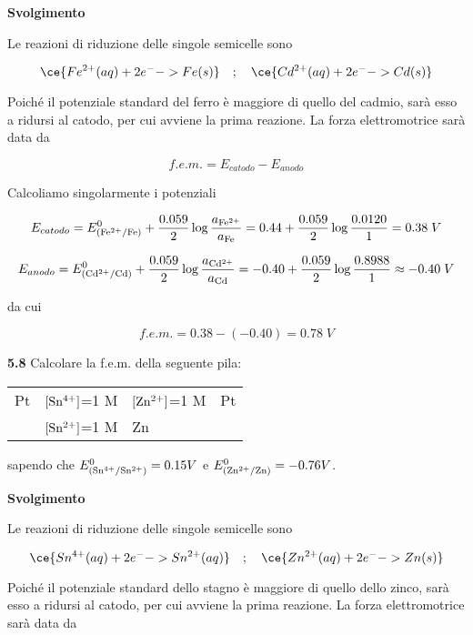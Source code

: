 \vspace{0.2cm}\large\textbf{Svolgimento}\normalsize

\vspace{0.2cm}Le reazioni di riduzione delle singole semicelle sono

$$\ce{Fe^{2+}(aq) + 2 e^- -> Fe(s)}
\quad;\quad
\ce{Cd^{2+}(aq) + 2 e^- -> Cd(s)}$$

Poiché il potenziale standard del ferro è maggiore di quello del cadmio, sarà esso a ridursi al catodo, per cui avviene la prima reazione. La forza elettromotrice sarà data da

$$f.e.m. = E_{catodo} - E_{anodo}$$

Calcoliamo singolarmente i potenziali

$$E_{catodo}
=E^0_{(\rm Fe^{2+}/Fe)} + \frac{0.059}{2} \log \frac{a_{\rm Fe^{2+}}}{a_{\rm Fe}}
=0.44 + \frac{0.059}{2} \log \frac{0.0120}{1}
=0.38\;V$$

$$E_{anodo} = E^0_{(\rm Cd^{2+}/Cd)} + \frac{0.059}{2} \log \frac{a_{\rm Cd^{2+}}}{a_{\rm Cd}}
=-0.40 + \frac{0.059}{2} \log \frac{0.8988}{1}
\approx -0.40\;V$$

da cui

$$f.e.m.=0.38 - (-0.40) = 0.78\;V$$

\vspace{0.2cm}\textbf{5.8} Calcolare la f.e.m. della seguente pila:

\begin{center}
    \begin{tabular}{p{0.6cm}|p{3cm}||p{3cm}|p{1cm}}
        Pt & $[\rm Sn^{4+}]$=1 M & $[\rm Zn^{2+}]$=1 M & Pt\\[0.5ex]
        & $[\rm Sn^{2+}]$=1 M & Zn &\\[0.5ex]
    \end{tabular}
\end{center}

sapendo che $E^0_{(\rm Sn^{4+}/Sn^{2+})}=0.15V$ e $E^0_{(\rm Zn^{2+}/Zn)}=-0.76V$.

\vspace{0.2cm}\large\textbf{Svolgimento}\normalsize

\vspace{0.2cm}Le reazioni di riduzione delle singole semicelle sono

$$\ce{Sn^{4+}(aq) + 2 e^- -> Sn^{2+}(aq)}
\quad;\quad
\ce{Zn^{2+}(aq) + 2 e^- -> Zn(s)}$$

Poiché il potenziale standard dello stagno è maggiore di quello dello zinco, sarà esso a ridursi al catodo, per cui avviene la prima reazione. La forza elettromotrice sarà data da

